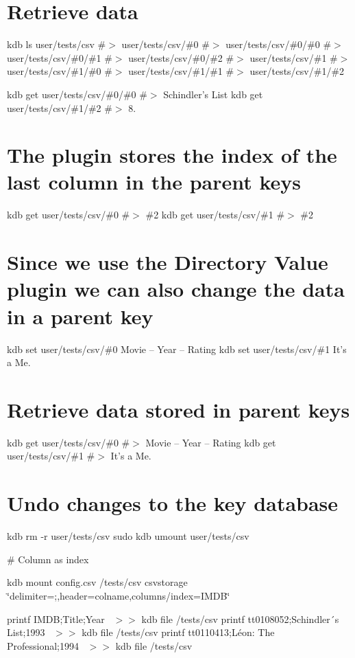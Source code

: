 \section*{Retrieve data}

kdb ls user/tests/csv \#$>$ user/tests/csv/\#0 \#$>$ user/tests/csv/\#0/\#0 \#$>$ user/tests/csv/\#0/\#1 \#$>$ user/tests/csv/\#0/\#2 \#$>$ user/tests/csv/\#1 \#$>$ user/tests/csv/\#1/\#0 \#$>$ user/tests/csv/\#1/\#1 \#$>$ user/tests/csv/\#1/\#2

kdb get user/tests/csv/\#0/\#0 \#$>$ Schindler’s List kdb get user/tests/csv/\#1/\#2 \#$>$ 8.

\section*{The plugin stores the index of the last column in the parent keys}

kdb get user/tests/csv/\#0 \#$>$ \#2 kdb get user/tests/csv/\#1 \#$>$ \#2

\section*{Since we use the Directory Value plugin we can also change the data in a parent key}

kdb set user/tests/csv/\#0 \textquotesingle{}Movie – Year – Rating\textquotesingle{} kdb set user/tests/csv/\#1 \textquotesingle{}It’s a Me.\textquotesingle{}

\section*{Retrieve data stored in parent keys}

kdb get user/tests/csv/\#0 \#$>$ Movie – Year – Rating kdb get user/tests/csv/\#1 \#$>$ It’s a Me.

\section*{Undo changes to the key database}

kdb rm -\/r user/tests/csv sudo kdb umount user/tests/csv 
\begin{DoxyCode}
# Column as index
\end{DoxyCode}
 kdb mount config.\+csv /tests/csv csvstorage \char`\"{}delimiter=;,header=colname,columns/index=\+I\+M\+D\+B\char`\"{}

printf \textquotesingle{}I\+M\+DB;Title;Year~\newline
\textquotesingle{} $>$$>$ {\ttfamily kdb file /tests/csv} printf \textquotesingle{}tt0108052;Schindler´s List;1993~\newline
\textquotesingle{} $>$$>$ {\ttfamily kdb file /tests/csv} printf \textquotesingle{}tt0110413;Léon\+: The Professional;1994~\newline
\textquotesingle{} $>$$>$ {\ttfamily kdb file /tests/csv}

